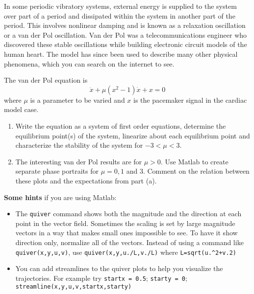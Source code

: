 \documentclass[12pt,letterpaper]{hmcpset}
\begin{document}
	
	
	\begin{problem}[1]
		In some periodic vibratory systems, external energy is supplied to the system over part of a
		period and dissipated within the system in another part of the period. This involves nonlinear
		damping and is known as a relaxation oscillation or a van der Pol oscillation. Van der Pol
		was a telecommunications engineer who discovered these stable oscillations while building
		electronic circuit models of the human heart. The model has since been used to describe
		many other physical phenomena, which you can search on the internet to see.
		
		The van der Pol equation is
		$$\ddot{x} + \mu (x^2 - 1)\dot{x} + x = 0$$
		where $\mu$ is a parameter to be varied and $x$ is the pacemaker signal in the cardiac model case.
		\begin{enumerate}
			\item Write the equation as a system of first order equations, determine the equilibrium point(s)
			of the system, linearize about each equilibrium point and characterize the stability of the
			system for $-3 < \mu < 3$.
			
			\item The interesting van der Pol results are for $\mu > 0$. Use Matlab to create separate phase
			portraits for $\mu = 0, 1$ and 3. Comment on the relation between these plots and the
			expectations from part (a).
		\end{enumerate}
		\textbf{Some hints} if you are using Matlab:
		\begin{itemize}
			\item The \texttt{quiver} command shows both the magnitude and the direction at each point
			in the vector field. Sometimes the scaling is set by large magnitude vectors in
			a way that makes small ones impossible to see. To have it show direction only,
			normalize all of the vectors. Instead of using a command like \texttt{quiver(x,y,u,v)},
			use \texttt{quiver(x,y,u./L,v./L)} where \texttt{L=sqrt(u.\^{}2+v.2)}
			
			\item You can add streamlines to the quiver plots to help you visualize the trajectories. For
			example try \texttt{startx = 0.5}; \texttt{starty = 0}; \texttt{streamline(x,y,u,v,startx,starty)}
		\end{itemize}
	\end{problem}
	
	
	\begin{solution}
		\vfill
	\end{solution}
	
\end{document}
